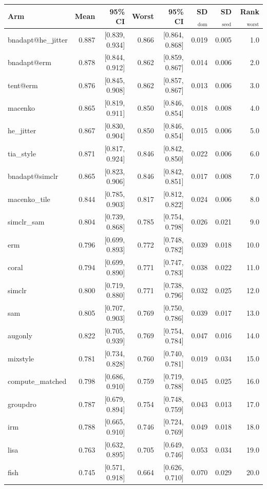 \begin{tabular}{lrrrrrrr}
\toprule
Arm & Mean & 95\% CI & Worst & 95\% CI & SD$_\text{dom}$ & SD$_\text{seed}$ & Rank$_\text{worst}$ \\
\midrule
bnadapt@he\_jitter & 0.887 & [0.839, 0.934] & 0.866 & [0.864, 0.868] & 0.019 & 0.005 & 1.0 \\
bnadapt@erm & 0.878 & [0.844, 0.912] & 0.862 & [0.859, 0.867] & 0.014 & 0.006 & 2.0 \\
tent@erm & 0.876 & [0.845, 0.908] & 0.862 & [0.857, 0.867] & 0.013 & 0.006 & 3.0 \\
macenko & 0.865 & [0.819, 0.911] & 0.850 & [0.846, 0.854] & 0.018 & 0.008 & 4.0 \\
he\_jitter & 0.867 & [0.830, 0.904] & 0.850 & [0.846, 0.854] & 0.015 & 0.006 & 5.0 \\
tia\_style & 0.871 & [0.817, 0.924] & 0.846 & [0.842, 0.850] & 0.022 & 0.006 & 6.0 \\
bnadapt@simclr & 0.865 & [0.823, 0.906] & 0.846 & [0.842, 0.851] & 0.017 & 0.008 & 7.0 \\
macenko\_tile & 0.844 & [0.785, 0.903] & 0.817 & [0.812, 0.822] & 0.024 & 0.006 & 8.0 \\
simclr\_sam & 0.804 & [0.739, 0.868] & 0.785 & [0.754, 0.798] & 0.026 & 0.021 & 9.0 \\
erm & 0.796 & [0.699, 0.893] & 0.772 & [0.748, 0.782] & 0.039 & 0.018 & 10.0 \\
coral & 0.794 & [0.699, 0.890] & 0.771 & [0.747, 0.783] & 0.038 & 0.022 & 11.0 \\
simclr & 0.800 & [0.719, 0.880] & 0.771 & [0.738, 0.796] & 0.032 & 0.025 & 12.0 \\
sam & 0.805 & [0.707, 0.903] & 0.769 & [0.750, 0.786] & 0.039 & 0.017 & 13.0 \\
augonly & 0.822 & [0.705, 0.939] & 0.769 & [0.754, 0.784] & 0.047 & 0.016 & 14.0 \\
mixstyle & 0.781 & [0.734, 0.828] & 0.760 & [0.740, 0.781] & 0.019 & 0.034 & 15.0 \\
compute\_matched & 0.798 & [0.686, 0.910] & 0.759 & [0.719, 0.788] & 0.045 & 0.025 & 16.0 \\
groupdro & 0.787 & [0.679, 0.894] & 0.754 & [0.748, 0.759] & 0.043 & 0.013 & 17.0 \\
irm & 0.788 & [0.665, 0.910] & 0.746 & [0.724, 0.769] & 0.049 & 0.018 & 18.0 \\
lisa & 0.763 & [0.632, 0.895] & 0.705 & [0.649, 0.746] & 0.053 & 0.034 & 19.0 \\
fish & 0.745 & [0.571, 0.918] & 0.664 & [0.626, 0.710] & 0.070 & 0.029 & 20.0 \\
\bottomrule
\end{tabular}
